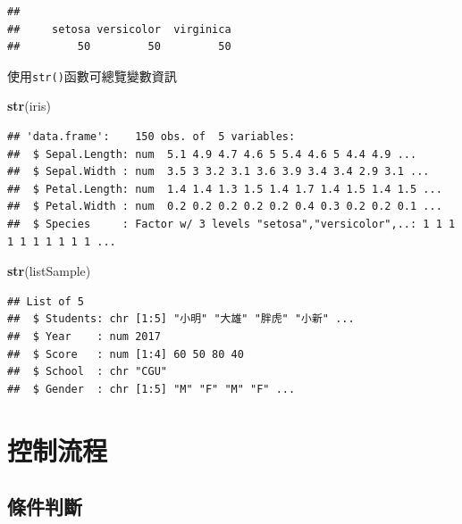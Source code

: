 \documentclass[]{book}
\newenvironment{Shaded}{\begin{snugshade}}{\end{snugshade}}
\newcommand{\KeywordTok}[1]{\textcolor[rgb]{0.13,0.29,0.53}{\textbf{{#1}}}}
\newcommand{\NormalTok}[1]{{#1}}
\theoremstyle{definition}
\theoremstyle{definition}
\theoremstyle{remark}
\begin{document}
\begin{Shaded}
\end{Shaded}

\begin{verbatim}
## 
##     setosa versicolor  virginica 
##         50         50         50
\end{verbatim}

使用\texttt{str()}函數可總覽變數資訊

\begin{Shaded}
\begin{Highlighting}[]
\KeywordTok{str}\NormalTok{(iris)}
\end{Highlighting}
\end{Shaded}

\begin{verbatim}
## 'data.frame':    150 obs. of  5 variables:
##  $ Sepal.Length: num  5.1 4.9 4.7 4.6 5 5.4 4.6 5 4.4 4.9 ...
##  $ Sepal.Width : num  3.5 3 3.2 3.1 3.6 3.9 3.4 3.4 2.9 3.1 ...
##  $ Petal.Length: num  1.4 1.4 1.3 1.5 1.4 1.7 1.4 1.5 1.4 1.5 ...
##  $ Petal.Width : num  0.2 0.2 0.2 0.2 0.2 0.4 0.3 0.2 0.2 0.1 ...
##  $ Species     : Factor w/ 3 levels "setosa","versicolor",..: 1 1 1 1 1 1 1 1 1 1 ...
\end{verbatim}

\begin{Shaded}
\begin{Highlighting}[]
\KeywordTok{str}\NormalTok{(listSample)}
\end{Highlighting}
\end{Shaded}

\begin{verbatim}
## List of 5
##  $ Students: chr [1:5] "小明" "大雄" "胖虎" "小新" ...
##  $ Year    : num 2017
##  $ Score   : num [1:4] 60 50 80 40
##  $ School  : chr "CGU"
##  $ Gender  : chr [1:5] "M" "F" "M" "F" ...
\end{verbatim}

\chapter{控制流程}\label{controlstructure}

\section{條件判斷}
\end{document}
